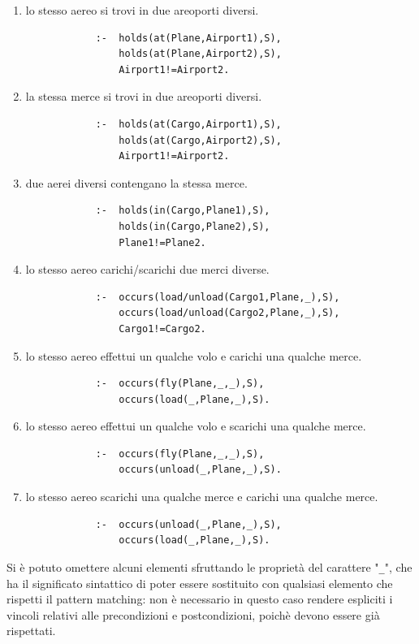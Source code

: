 \documentclass[a4paper,oneside,12pt]{book}
\begin{document}
    \begin{enumerate}
        \item lo stesso aereo si trovi in due areoporti diversi. \label{itm:p_at}
        \begin{verbatim}
            :-  holds(at(Plane,Airport1),S),
                holds(at(Plane,Airport2),S),
                Airport1!=Airport2.
        \end{verbatim}
        \item la stessa merce si trovi in due areoporti diversi. \label{itm:c_at}
        \begin{verbatim}
            :-  holds(at(Cargo,Airport1),S),
                holds(at(Cargo,Airport2),S),
                Airport1!=Airport2.
        \end{verbatim}
        \item due aerei diversi contengano la stessa merce. \label{itm:c_in}
        \begin{verbatim}
            :-  holds(in(Cargo,Plane1),S),
                holds(in(Cargo,Plane2),S),
                Plane1!=Plane2.
        \end{verbatim}
        \item lo stesso aereo carichi/scarichi due merci diverse.
        \begin{verbatim}
            :-  occurs(load/unload(Cargo1,Plane,_),S),
                occurs(load/unload(Cargo2,Plane,_),S),
                Cargo1!=Cargo2.
        \end{verbatim}
        \item lo stesso aereo effettui un qualche volo e carichi una qualche merce.
        \begin{verbatim}
            :-  occurs(fly(Plane,_,_),S),
                occurs(load(_,Plane,_),S).
        \end{verbatim}
        \item lo stesso aereo effettui un qualche volo e scarichi una qualche merce.
        \begin{verbatim}
            :-  occurs(fly(Plane,_,_),S),
                occurs(unload(_,Plane,_),S).
        \end{verbatim}
        \item lo stesso aereo scarichi una qualche merce e carichi una qualche merce.
        \begin{verbatim}
            :-  occurs(unload(_,Plane,_),S),
                occurs(load(_,Plane,_),S).
        \end{verbatim}
    \end{enumerate}
    Si è potuto omettere alcuni elementi sfruttando le proprietà del carattere "\texttt{\_}",
    che ha il significato sintattico di poter essere sostituito con qualsiasi elemento che rispetti
    il pattern matching: non è necessario in questo caso rendere espliciti i vincoli relativi
    alle precondizioni e postcondizioni, poichè devono essere già rispettati.
\end{document}
